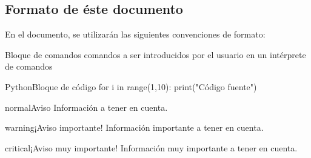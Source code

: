 \subsection{Formato de éste documento}
\label{subsec:format}

En el documento, se utilizarán las siguientes convenciones de formato:

    \begin{TMterminal}{}{}{Bloque de comandos}
      comandos a ser introducidos por el usuario en un intérprete de comandos
    \end{TMterminal}

    \vspace{0.2cm}

    \begin{TMcode}{Python}{}{Bloque de código}
      for i in range(1,10):
          print("Código fuente")
    \end{TMcode}

    \begin{TMbulletin}{normal}{Aviso}
      Información a tener en cuenta.
    \end{TMbulletin}

    \begin{TMbulletin}{warning}{$¡$Aviso importante!}
      Información importante a tener en cuenta.
    \end{TMbulletin}

    \begin{TMbulletin}{critical}{$¡$Aviso muy importante!}
      Información muy importante a tener en cuenta.
    \end{TMbulletin}
\clearpage
